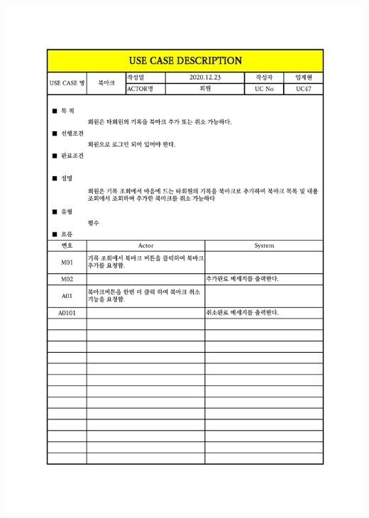 {{{{{{{{{{{{{{{{{{{{{{{{{{{{{{{{{{{{{{{{{{{{{{{{{{\includegraphics[width=1.1\textwidth]{./Figure/Design/Display/usecase/047.pdf} \\
}}}}}}}}}}}}}}}}}}}}}}}}}}}}}}}}}}}}}}}}}}}}}}}}}}
